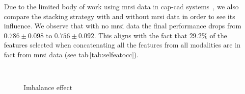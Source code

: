 \documentclass[num-refs]{wiley-article}
\begin{document}
Due to the limited body of work using \ac{mrsi} data in \ac{cap}-\ac{cad}
systems~\cite{lemaitre2015computer}, we also compare the stacking strategy with
and without \ac{mrsi} data in order to see its influence. We observe that with
no \ac{mrsi} data the final performance drops from 
$0.786 \pm 0.098$ to $0.756 \pm 0.092$.
This aligns with the fact that $29.2\%$ of the features selected when
concatenating all the features from all modalities are in fact from \ac{mrsi}
data (see \Ac{tab}\,\ref{tab:selfeatocc}).

\begin{figure}
  \hspace*{\fill}
  \hfill
  \hspace*{\fill}\\
  \hspace*{\fill}
  \hfill
  \hspace*{\fill}
  \caption[] {Imbalance effect}
  \label{fig:imbalance}
\end{figure}
\end{document}
